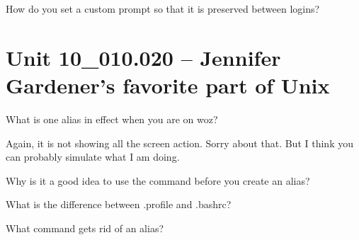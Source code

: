 \documentclass[letterpaper,12pt]{exam}
\newcommand{\unit}{Unit 10}
\begin{document}
\begin {questions}
\begin{samepage}
\question How do you set a custom prompt so that it is preserved between logins? 
\end{samepage}

\section*{\unit\_010.020 -- Jennifer Gardener's favorite part of Unix}

\begin{samepage}
\question What is one alias in effect when you are on woz? 
\vspace{5mm}
\end{samepage}


\noindent Again, it is not showing all the screen action.  Sorry about that.  But I think you can probably simulate what I am doing.


\begin{samepage}
\question Why is it a good idea to use the  command before you create an alias? 

\begin{samepage}
\question What is the difference between .profile and .bashrc? 
\vspace{5mm}
\end{samepage}
\end{samepage}

\begin{samepage}
\question What command gets rid of an alias? 
\vspace{5mm}
\end{samepage}

\end{questions}
\end{document}
